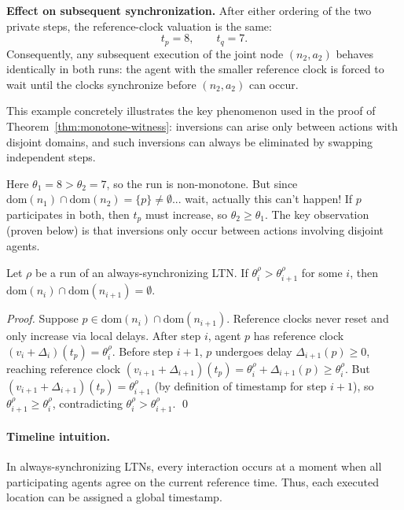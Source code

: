 \begin{example}
\smallskip
\noindent
\textbf{Effect on subsequent synchronization.}
After either ordering of the two private steps, the reference-clock valuation is
the same:
\[
t_p=8,\qquad t_q=7.
\]
Consequently, any subsequent execution of the joint node $(n_2,a_2)$ behaves
identically in both runs: the agent with the smaller reference clock is forced to
wait until the clocks synchronize before $(n_2,a_2)$ can occur.

This example concretely illustrates the key phenomenon used in the proof of
Theorem~\ref{thm:monotone-witness}: inversions can arise only between actions with
disjoint domains, and such inversions can always be eliminated by swapping
independent steps.

Here $\theta_1 = 8 > \theta_2 = 7$, so the run is non-monotone. But since $\text{dom}(n_1) \cap \text{dom}(n_2) = \{p\} \neq \emptyset$... wait, actually this can't happen! If $p$ participates in both, then $t_p$ must increase, so $\theta_2 \geq \theta_1$. The key observation (proven below) is that inversions only occur between actions involving disjoint agents.
\end{example}

\begin{lemma}
\label{lem:inversion-disjoint}
Let $\rho$ be a run of an always-synchronizing LTN. If $\theta^\rho_i > \theta^\rho_{i+1}$ for some $i$, then $\text{dom}(n_i) \cap \text{dom}(n_{i+1}) = \emptyset$.
\end{lemma}

\begin{proof}
Suppose $p \in \text{dom}(n_i) \cap \text{dom}(n_{i+1})$. Reference clocks never reset and only increase via local delays. After step $i$, agent $p$ has reference clock $(v_i + \Delta_i)(t_p) = \theta^\rho_i$. Before step $i+1$, $p$ undergoes delay $\Delta_{i+1}(p) \geq 0$, reaching reference clock $(v_{i+1} + \Delta_{i+1})(t_p) = \theta^\rho_i + \Delta_{i+1}(p) \geq \theta^\rho_i$. But $(v_{i+1} + \Delta_{i+1})(t_p) = \theta^\rho_{i+1}$ (by definition of timestamp for step $i+1$), so $\theta^\rho_{i+1} \geq \theta^\rho_i$, contradicting $\theta^\rho_i > \theta^\rho_{i+1}$. \qed
\end{proof}

\paragraph{Timeline intuition.}
In always-synchronizing LTNs, every interaction occurs at a moment when
all participating agents agree on the current reference time.
Thus, each executed location can be assigned a global timestamp.

